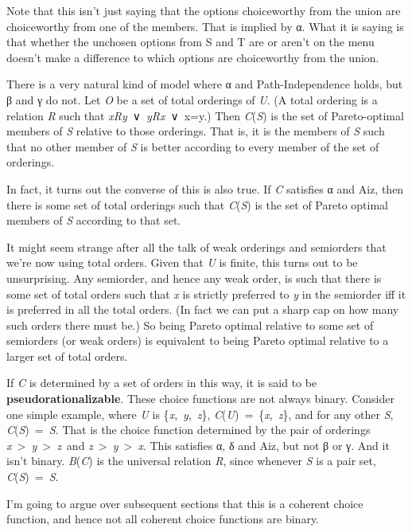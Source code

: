 \documentclass[
  11pt,
  letterpaper,
  DIV=11,
  numbers=noendperiod,
  twoside]{scrartcl}
\begin{document}
Note that this isn't just saying that the options choiceworthy from the
union are choiceworthy from one of the members. That is implied by α.
What it is saying is that whether the unchosen options from S and T are
or aren't on the menu doesn't make a difference to which options are
choiceworthy from the union.

There is a very natural kind of model where α and Path-Independence
holds, but β and γ do not. Let \emph{O} be a set of total orderings of
\emph{U}. (A total ordering is a relation \emph{R} such that
\emph{xRy}~∨~\emph{yRx}~∨~x=y.) Then \emph{C}(\emph{S}) is the set of
Pareto-optimal members of \emph{S} relative to those orderings. That is,
it is the members of \emph{S} such that no other member of \emph{S} is
better according to every member of the set of orderings.

In fact, it turns out the converse of this is also true. If \emph{C}
satisfies α and Aiz, then there is some set of total orderings such that
\emph{C}(\emph{S}) is the set of Pareto optimal members of \emph{S}
according to that set.

It might seem strange after all the talk of weak orderings and
semiorders that we're now using total orders. Given that \emph{U} is
finite, this turns out to be unsurprising. Any semiorder, and hence any
weak order, is such that there is some set of total orders such that
\emph{x} is strictly preferred to \emph{y} in the semiorder iff it is
preferred in all the total orders. (In fact we can put a sharp cap on
how many such orders there must be.) So being Pareto optimal relative to
some set of semiorders (or weak orders) is equivalent to being Pareto
optimal relative to a larger set of total orders.

If \emph{C} is determined by a set of orders in this way, it is said to
be \textbf{pseudorationalizable}. These choice functions are not always
binary. Consider one simple example, where \emph{U} is
\{\emph{x},~\emph{y},~\emph{z}\},
\emph{C}(\emph{U})~=~\{\emph{x},~\emph{z}\}, and for any other \emph{S},
\emph{C}(\emph{S})~=~\emph{S}. That is the choice function determined by
the pair of orderings
\emph{x}~\textgreater~\emph{y}~\textgreater~\emph{z}~and
\emph{z}~\textgreater~\emph{y}~\textgreater~\emph{x}. This satisfies α,
δ and Aiz, but not β or γ. And it isn't binary. \emph{B}(\emph{C}) is
the universal relation \emph{R}, since whenever \emph{S} is a pair set,
\emph{C}(\emph{S})~=~\emph{S}.

I'm going to argue over subsequent sections that this is a coherent
choice function, and hence not all coherent choice functions are binary.
\end{document}
